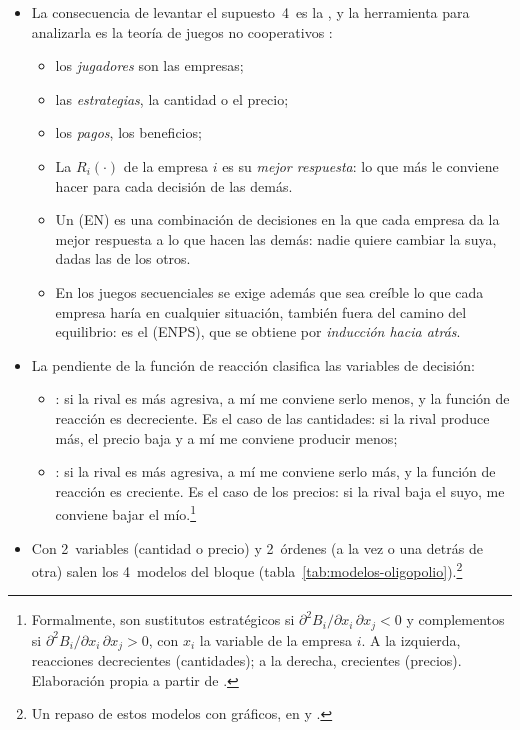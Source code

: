 \documentclass[11pt]{article}
\begin{document}
\begin{itemize}
\begin{enumerate}
\begin{itemize}
    \end{itemize}
    Sin barreras, la amenaza de entrada limita lo que pueden ganar las empresas instaladas (\ref{sec:limites-cooperacion}).
  \end{enumerate}
\item La consecuencia de levantar el supuesto~4~es la , y la herramienta para analizarla es la teoría de juegos no cooperativos :
  \begin{itemize}
  \item los \emph{jugadores} son las empresas;
  \item las \emph{estrategias}, la cantidad o el precio;
  \item los \emph{pagos}, los beneficios;
  \item La  $R_i(\cdot)$ de la empresa $i$ es su \emph{mejor respuesta}: lo que más le conviene hacer para cada decisión de las demás.
  \item Un  (EN) es una combinación de decisiones en la que cada empresa da la mejor respuesta a lo que hacen las demás: nadie quiere cambiar la suya, dadas las de los otros.
  \item En los juegos secuenciales se exige además que sea creíble lo que cada empresa haría en cualquier situación, también fuera del camino del equilibrio: es el  (ENPS), que se obtiene por \emph{inducción hacia atrás}.
  \end{itemize}
\item La pendiente de la función de reacción clasifica las variables de decisión\nocite{BulowGeanakoplosKlemperer1985Multimarket}:
  \begin{itemize}
  \item {}: si la rival es más agresiva, a mí me conviene serlo menos, y la función de reacción es decreciente. Es el caso de las cantidades: si la rival produce más, el precio baja y a mí me conviene producir menos;
  \item {}: si la rival es más agresiva, a mí me conviene serlo más, y la función de reacción es creciente. Es el caso de los precios: si la rival baja el suyo, me conviene bajar el mío.\footnote{Formalmente, son sustitutos estratégicos si $\partial^2B_i/\partial x_i\,\partial x_j<0$ y complementos si $\partial^2B_i/\partial x_i\,\partial x_j>0$, con $x_i$ la variable de la empresa $i$. A la izquierda, reacciones decrecientes (cantidades); a la derecha, crecientes (precios). Elaboración propia a partir de \textcite[cap.~3]{ChevalierRoignantTrigeorgis2011Competitive}.}
  \end{itemize}
\item Con 2~variables (cantidad o precio) y 2~órdenes (a la vez o una detrás de otra) salen los 4~modelos del bloque (tabla~\ref{tab:modelos-oligopolio}).\footnote{Un repaso de estos modelos con gráficos, en \textcite{PoliconomicsOligopolio1} y \textcite{PoliconomicsOligopolio2}.}
\end{itemize}
\end{document}
